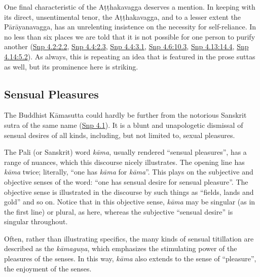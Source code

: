 \documentclass[12pt,openany]{book}%
\begin{document}
One final characteristic of the \textsanskrit{Aṭṭhakavagga} deserves a mention. In keeping with its direct, unsentimental tenor, the \textsanskrit{Aṭṭhakavagga}, and to a lesser extent the \textsanskrit{Pārāyanavagga}, has an unrelenting insistence on the necessity for self-reliance. In no less than six places we are told that it is not possible for one person to purify another (\href{https://suttacentral.net/snp4.2/en/sujato\#2.2}{Snp 4.2:2.2}, \href{https://suttacentral.net/snp4.4/en/sujato\#2.3}{Snp 4.4:2.3}, \href{https://suttacentral.net/snp4.4/en/sujato\#3.1}{Snp 4.4:3.1}, \href{https://suttacentral.net/snp4.6/en/sujato\#10.3}{Snp 4.6:10.3}, \href{https://suttacentral.net/snp4.13/en/sujato\#14.4}{Snp 4.13:14.4}, \href{https://suttacentral.net/snp4.14/en/sujato\#5.2}{Snp 4.14:5.2}). As always, this is repeating an idea that is featured in the prose suttas as well, but its prominence here is striking.

\subsection*{Sensual Pleasures}

The Buddhist \textsanskrit{Kāmasutta} could hardly be further from the notorious Sanskrit sutra of the same name (\href{https://suttacentral.net/snp4.1/en/sujato}{Snp 4.1}). It is a blunt and unapologetic dismissal of sensual desires of all kinds, including, but not limited to, sexual pleasures.

The Pali (or Sanskrit) word \textit{\textsanskrit{kāma}}, usually rendered “sensual pleasures”, has a range of nuances, which this discourse nicely illustrates. The opening line has \textit{\textsanskrit{kāma}} twice; literally, “one has \textit{\textsanskrit{kāma}} for \textit{\textsanskrit{kāma}}”. This plays on the subjective and objective senses of the word: “one has sensual desire for sensual pleasure”. The objective sense is illustrated in the discourse by such things as “fields, lands and gold” and so on. Notice that in this objective sense, \textit{\textsanskrit{kāma}} may be singular (as in the first line) or plural, as here, whereas the subjective “sensual desire” is singular throughout.

Often, rather than illustrating specifics, the many kinds of sensual titillation are described as the \textit{\textsanskrit{kāmaguṇa}}, which emphasizes the stimulating power of the pleasures of the senses. In this way, \textit{\textsanskrit{kāma}} also extends to the sense of “pleasure”, the enjoyment of the senses.
\end{document}
